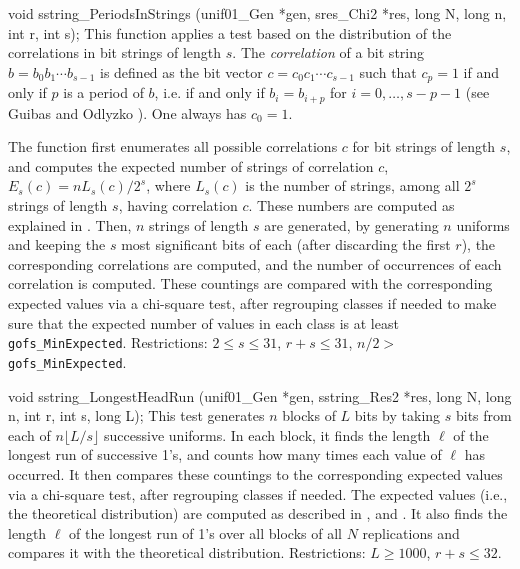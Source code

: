 
\code


void sstring_PeriodsInStrings (unif01_Gen *gen, sres_Chi2 *res,
                               long N, long n, int r, int s);
\endcode
 \tab  This function applies a test
%
   based on the distribution of the correlations
%
   in  bit strings of length $s$.
   The {\em correlation\/} of a bit string $b = b_0 b_1 \cdots b_{s-1}$
   is defined as the bit vector $c = c_0 c_1 \cdots c_{s-1}$ such that
   $c_p=1$ if and only if $p$ is a period of $b$, i.e.  if and only if
   $b_i = b_{i+p}$ for $i=0,\dots,s-p-1$
   (see Guibas and Odlyzko \cite{pGUI81a}).
   One always has $c_0=1$.

   The function first enumerates all possible correlations $c$ for bit
   strings of length $s$, and computes  the expected number of strings
   of correlation $c$, $E_s(c) = n L_s(c)/2^s$,
   where $L_s(c)$ is the number of strings, among all $2^s$ strings
   of length $s$, having correlation $c$.
   These numbers are computed as explained in \cite{pGUI81a}.
   Then, $n$ strings of length $s$ are generated, by generating $n$
   uniforms and keeping the $s$ most significant bits of each
   (after discarding the first $r$), the corresponding correlations are
   computed, and the number of occurrences of each correlation is
   computed.  These countings are compared with the corresponding
   expected values via a chi-square test, after regrouping classes
   if needed to make sure that the expected number of values in each class
   is at least {\tt gofs\_MinExpected}.
   Restrictions: $2 \le s \le 31$, $r + s \le 31$,
   $n/2 > $ {\tt gofs\_MinExpected}.
 \endtab
\code


void sstring_LongestHeadRun (unif01_Gen *gen, sstring_Res2 *res,
                             long N, long n, int r, int s, long L);
\endcode
 \tab  This test
%
   generates $n$ blocks of $L$ bits by taking $s$ bits
   from each of $n \lfloor L/s\rfloor$ successive uniforms.
   In each block, it finds the length $\ell$ of the longest run
   of successive 1's, and counts how many times each value of $\ell$
   has occurred.  It then compares these countings to the corresponding
   expected values via a chi-square test, after regrouping classes
   if needed.  The expected values (i.e., the theoretical distribution)
   are computed as described in \cite{tFOL79a}, \cite{tGOR86a} and
   \cite[p. 21]{rRUK01a}. It also finds the length $\ell$ of the longest run
   of 1's over all blocks of  all $N$ replications
   and compares it with  the theoretical distribution.
   Restrictions: $L \ge 1000$,  $r + s \le 32$.
 \endtab
{}
\code


